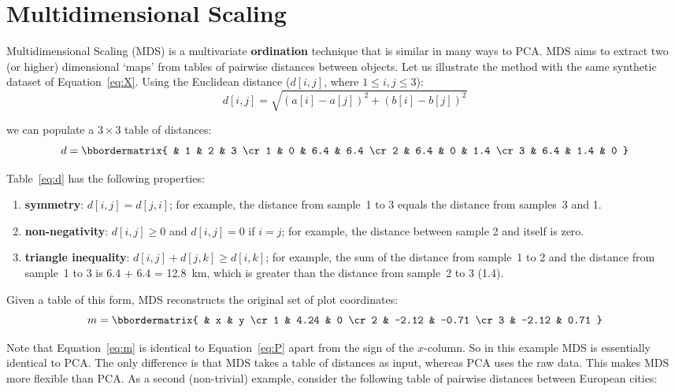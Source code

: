 \section{Multidimensional Scaling}
\label{sec:MDS}

Multidimensional Scaling (MDS) is a multivariate \textbf{ordination}
technique that is similar in many ways to PCA. MDS aims to extract two
(or higher) dimensional `maps' from tables of pairwise distances
between objects. Let us illustrate the method with the same synthetic
dataset of Equation~\ref{eq:X}. Using the Euclidean distance
($d[i,j]$, where $1\leq{i,j}\leq{3}$):
\begin{equation}
  d[i,j] = \sqrt{(a[i]-a[j])^2 + (b[i]-b[j])^2}
  \label{eq:euclidean}
\end{equation}

\noindent we can populate a ${3}\times{3}$ table of distances:
\begin{equation}
  d = \bbordermatrix{ & 1 & 2 & 3 \cr
    1 & 0 & 6.4 & 6.4 \cr
    2 & 6.4 & 0 & 1.4 \cr
    3 & 6.4 & 1.4 & 0
  }
  \label{eq:d}
\end{equation}

Table~\ref{eq:d} has the following properties:

\begin{enumerate}
\item{\bf symmetry}: $d[i,j]=d[j,i]$; for example, the distance from
  sample~1 to 3 equals the distance from samples~3 and 1.
\item{\bf non-negativity}: $d[i,j]\geq{0}$ and $d[i,j]=0$ if $i=j$;
  for example, the distance between sample 2 and itself is zero.
\item{\bf triangle inequality}: $d[i,j]+d[j,k]\geq{d[i,k]}$; for
  example, the sum of the distance from sample~1 to 2 and the
  distance from sample~1 to 3 is 6.4 + 6.4 = 12.8~km, which is
  greater than the distance from sample~2 to 3 (1.4).
\end{enumerate}

Given a table of this form, MDS reconstructs the original set of plot
coordinates:
\begin{equation}
  m = \bbordermatrix{ & x & y \cr
    1 & 4.24 & 0 \cr
    2 & -2.12 & -0.71 \cr
    3 & -2.12 & 0.71 
  }
  \label{eq:m}
\end{equation}

Note that Equation~\ref{eq:m} is identical to Equation~\ref{eq:P}
apart from the sign of the $x$-column.  So in this example MDS is
essentially identical to PCA. The only difference is that MDS takes a
table of distances as input, whereas PCA uses the raw data. This makes
MDS more flexible than PCA. As a second (non-trivial) example,
consider the following table of pairwise distances between European
cities:

